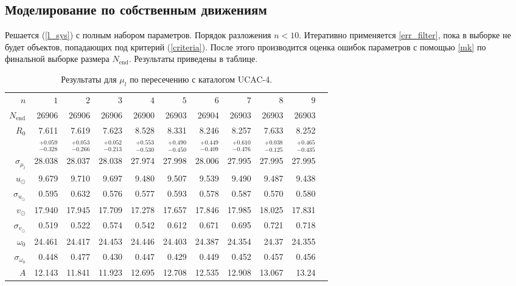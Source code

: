 \documentclass{matmex-diploma-custom}
\begin{document}
\subsection{Моделирование по собственным движениям}
Решается (\ref{l_sys}) с полным набором параметров. Порядок разложения $n < 10$. Итеративно применяется \ref{err_filter}, пока в выборке не будет объектов, попадающих под критерий (\ref{criteria}). После этого производится оценка ошибок параметров с помощью \ref{mk} по финальной выборке размера $N_{\mathrm{end}}$. Результаты приведены в таблице. 
\begin{table}[h!!]
\centering
\caption{Результаты для $\mu_l$ по пересечению с каталогом UCAC-4.}
\begin{tabular}{r|rrr|r|rrrrrr}
\hline
$n$ & $1$ & $2$ & $3$ & $4$ & $5$&$ 6 $&$ 7 $&$ 8 $&$ 9 $\\
 $N_{\mathrm{end}}$ & 26906       &   26906 &   26906 &   26900 &   26903 &   26904 &   26903 &   26903 &   26903 \\
 $R_0 $& 7.611       &   7.619 &   7.623 &   8.528 &   8.331 &   8.246 &   8.257 &   7.633 &   8.252 \\
       & $_{-0.328}^{+0.059} $ & $_{-0.266}^{+0.053}$ & $_{-0.213}^{+0.052}$   & $_{-0.530}^{+0.553}$  & $_{-0.450}^{+0.490}$  & $_{-0.409}^{+0.449}$  & $_{-0.476}^{+0.610}$  & $_{-0.125}^{+0.038}$  & $_{-0.435}^{+0.465}$  \\\hline
 $\sigma_{\mu_l} $& 28.038      &  28.037 &  28.038 &  27.974 &  27.998 &  28.006 &  27.995 &  27.995 &  27.995 \\
 $ u_{\odot} $& 9.679       &    9.710 &   9.697 &    9.480 &   9.507 &   9.539 &    9.490 &   9.487 &   9.438 \\
 $\sigma_{u_{\odot}} $&0.595       &   0.632 &   0.576 &   0.577 &   0.593 &   0.578 &   0.587 &    0.570 &    0.580 \\
 $v_{\odot} $& 17.940      &  17.945 &  17.709 &  17.278 &  17.657 &  17.846 &  17.985 &  18.025 &  17.831 \\
 $\sigma_{v_{\odot}}$&0.519       &   0.522 &   0.574 &   0.542 &   0.612 &   0.671 &   0.695 &   0.721 &   0.718 \\
 $\omega_0 $&24.461      &  24.417 &  24.453 &  24.446 &  24.403 &  24.387 &  24.354 &   24.37 &  24.355 \\
 $\sigma_{\omega_0} $& 0.448       &   0.477 &    0.430 &   0.447 &   0.429 &   0.449 &   0.452 &   0.457 &   0.456 \\\hline
 $A $&12.143      &  11.841 &  11.923 &  12.695 &  12.708 &  12.535 &  12.908 &  13.067 &   13.24 \\

\end{tabular}
\end{table}
\end{document}
